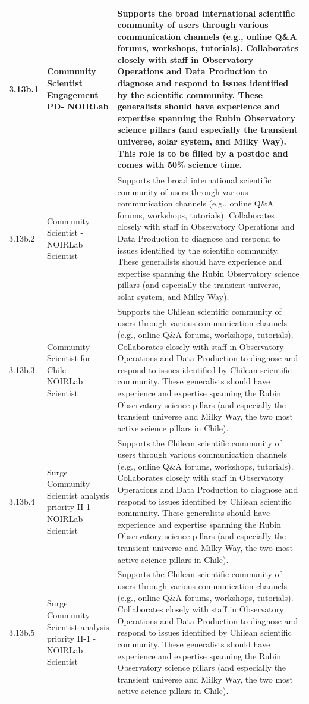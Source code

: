 \begin{longtable} {|p{}|p{}|p{}|}
{3.13b.1}&{Community Scientist Engagement PD- NOIRLab}&{Supports the broad international scientific community of users through various communication channels (e.g., online Q\&A forums, workshops, tutorials). Collaborates closely with staff in Observatory Operations and Data Production to diagnose and respond to issues identified by the scientific community.  These generalists should have experience and expertise spanning the Rubin Observatory science pillars (and especially the transient universe, solar system, and Milky Way). This role is to be filled by a postdoc and comes with 50\% science time.} \\ \hline
{3.13b.2}&{Community Scientist - NOIRLab Scientist}&{Supports the broad international scientific community of users through various communication channels (e.g., online Q\&A forums, workshops, tutorials). Collaborates closely with staff in Observatory Operations and Data Production to diagnose and respond to issues identified by the scientific community.  These generalists should have experience and expertise spanning the Rubin Observatory science pillars (and especially the transient universe, solar system, and Milky Way). } \\ \hline
{3.13b.3}&{Community Scientist for Chile - NOIRLab Scientist}&{Supports the Chilean scientific community of users through various communication channels (e.g., online Q\&A forums, workshops, tutorials). Collaborates closely with staff in Observatory Operations and Data Production to diagnose and respond to issues identified by Chilean scientific community.  These generalists should have experience and expertise spanning the Rubin Observatory science pillars (and especially the transient universe and Milky Way, the two most active science pillars in Chile). } \\ \hline
{3.13b.4}&{Surge Community Scientist analysis priority II-1 - NOIRLab Scientist}&{Supports the Chilean scientific community of users through various communication channels (e.g., online Q\&A forums, workshops, tutorials). Collaborates closely with staff in Observatory Operations and Data Production to diagnose and respond to issues identified by Chilean scientific community.  These generalists should have experience and expertise spanning the Rubin Observatory science pillars (and especially the transient universe and Milky Way, the two most active science pillars in Chile). } \\ \hline
{3.13b.5}&{Surge Community Scientist analysis priority II-1 - NOIRLab Scientist}&{Supports the Chilean scientific community of users through various communication channels (e.g., online Q\&A forums, workshops, tutorials). Collaborates closely with staff in Observatory Operations and Data Production to diagnose and respond to issues identified by Chilean scientific community.  These generalists should have experience and expertise spanning the Rubin Observatory science pillars (and especially the transient universe and Milky Way, the two most active science pillars in Chile). } \\ \hline

\end{longtable}
